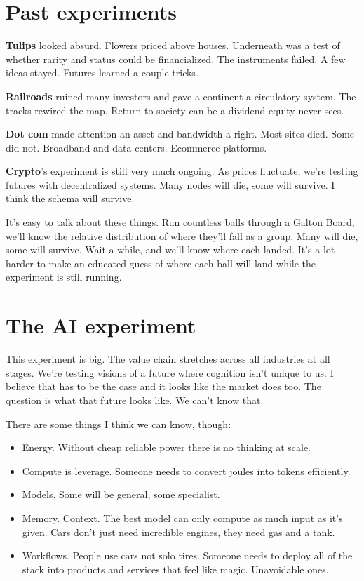 \documentclass[12pt,letterpaper]{article}
\begin{document}
\section{Past experiments}

\textbf{Tulips} looked absurd. Flowers priced above houses. Underneath was a test of whether rarity and status could be financialized. The instruments failed. A few ideas stayed. Futures learned a couple tricks.

\textbf{Railroads} ruined many investors and gave a continent a circulatory system. The tracks rewired the map. Return to society can be a dividend equity never sees.

\textbf{Dot com} made attention an asset and bandwidth a right. Most sites died. Some did not. Broadband and data centers. Ecommerce platforms.

\textbf{Crypto}'s experiment is still very much ongoing. As prices fluctuate, we're testing futures with decentralized systems. Many nodes will die, some will survive. I think the schema will survive.

It's easy to talk about these things. Run countless balls through a Galton Board, we'll know the relative distribution of where they'll fall as a group. Many will die, some will survive. Wait a while, and we'll know where each landed. It's a lot harder to make an educated guess of where each ball will land while the experiment is still running.

\section{The AI experiment}

This experiment is big. The value chain stretches across all industries at all stages. We're testing visions of a future where cognition isn't unique to us. I believe that has to be the case and it looks like the market does too. The question is what that future looks like. We can't know that.

There are some things I think we can know, though:

\begin{itemize}
    \item Energy. Without cheap reliable power there is no thinking at scale.
    \item Compute is leverage. Someone needs to convert joules into tokens efficiently.
    \item Models. Some will be general, some specialist.
    \item Memory. Context. The best model can only compute as much input as it's given. Cars don't just need incredible engines, they need gas and a tank.
    \item Workflows. People use cars not solo tires. Someone needs to deploy all of the stack into products and services that feel like magic. Unavoidable ones.
\end{itemize}
\end{document}
